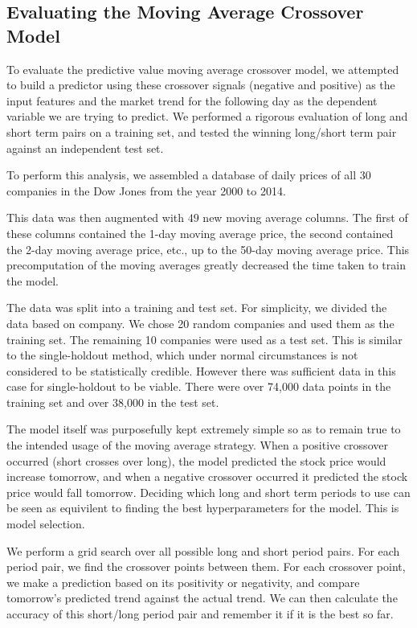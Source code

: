 \documentclass{report}
\begin{document}
\subsection{Evaluating the Moving Average Crossover Model}

To evaluate the predictive value moving average crossover model, we attempted to build a predictor using these crossover signals (negative and positive) as the input features and the market trend for the following day as the dependent variable we are trying to predict. We performed a rigorous evaluation of long and short term pairs on a training set, and tested the winning long/short term pair against an independent test set.

To perform this analysis, we assembled a database of daily prices of all 30 companies in the Dow Jones from the year 2000 to 2014.

This data was then augmented with $49$ new moving average columns. The first of these columns contained the 1-day moving average price, the second contained the 2-day moving average price, etc., up to the 50-day moving average price. This precomputation of the moving averages greatly decreased the time taken to train the model.

The data was split into a training and test set. For simplicity, we divided the data based on company. We chose 20 random companies and used them as the training set. The remaining 10 companies were used as a test set. This is similar to the single-holdout method, which under normal circumstances is not considered to be statistically credible. However there was sufficient data in this case for single-holdout to be viable. There were over 74,000 data points in the training set and over 38,000 in the test set.

The model itself was purposefully kept extremely simple so as to remain true to the intended usage of the moving average strategy. When a positive crossover occurred (short crosses over long), the model predicted the stock price would increase tomorrow, and when a negative crossover occurred it predicted the stock price would fall tomorrow. Deciding which long and short term periods to use can be seen as equivilent to finding the best hyperparameters for the model. This is model selection.

We perform a grid search over all possible long and short period pairs. For each period pair, we find the crossover points between them. For each crossover point, we make a prediction based on its positivity or negativity, and compare tomorrow's predicted trend against the actual trend. We can then calculate the accuracy of this short/long period pair and remember it if it is the best so far.
\end{document}
